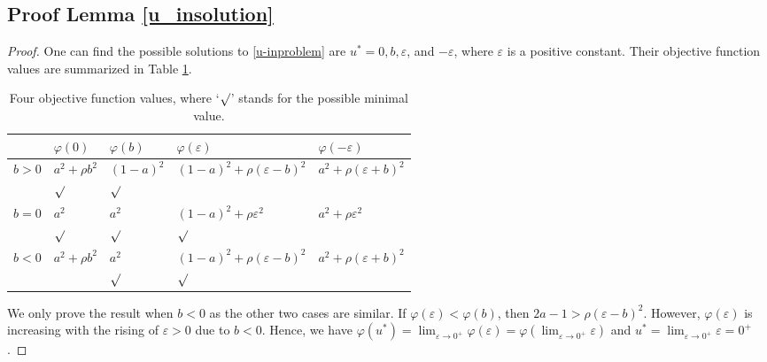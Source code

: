 \documentclass[journal]{IEEEtran}
\begin{document}
\subsection{Proof Lemma \ref{u_insolution}}
\begin{proof} One can find the possible solutions to \eqref{u-inproblem} are $u^*=0,b,\varepsilon$, and $-\varepsilon$, where $\varepsilon$ is a positive constant. Their objective function  values are summarized in Table \ref{obj-values}.

\begin{table}[H]
	\renewcommand{\arraystretch}{1.25}\addtolength{\tabcolsep}{10pt}
\centering
\caption{Four objective function  values, where `$\surd$' stands for the possible minimal value. \label{obj-values}}
\begin{tabular}{c llll}\hline
 &$\varphi (0)$& $\varphi (b)$& $\varphi (\varepsilon)$& $\varphi (-\varepsilon)$\\\hline
\multirow{2}{*}{ $b>0$} & $a^2+\rho  b^2$ & $(1-a)^2$ & $(1-a)^2+\rho  (\varepsilon-b)^2$ &   $a^2+\rho  (\varepsilon+b)^2$ \\
 &$\surd$&$\surd$&& \\\hline
\multirow{2}{*}{   $b=0$} & $a^2$ & $a^2$ & $(1-a)^2+\rho  \varepsilon^2$ &  $a^2+\rho  \varepsilon^2$ \\
 &$\surd$&$\surd$&$\surd$& \\\hline
\multirow{2}{*}{    $b<0$} & $a^2+\rho  b^2$ & $a^2$ & $(1-a)^2+\rho  (\varepsilon-b)^2$ &   $a^2+\rho  (\varepsilon+b)^2$ \\
 &&$\surd$&$\surd$& \\\hline
\end{tabular}
\end{table}\vspace{-3mm}
\noindent We only prove the result when $b<0$ as the other two cases are similar. If  $\varphi (\varepsilon)< \varphi (b)$, then  $2a-1 > \rho (\varepsilon-b)^2$. However, $\varphi (\varepsilon)$ is increasing with the rising of $\varepsilon>0$ due to $b<0$. Hence, we have $\varphi (u^*)=\lim_{\varepsilon \to0^+}\varphi (\varepsilon) = \varphi (\lim_{\varepsilon\to0^+} \varepsilon)$ and $u^*=\lim_{\varepsilon\to0^+} \varepsilon=0^+$.
\end{proof}
\end{document}

